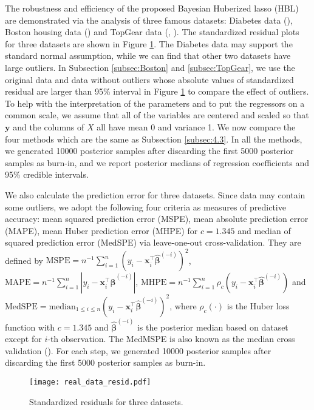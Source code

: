 \documentclass[11pt]{article}
\theoremstyle{plain}
\theoremstyle{definition}
\begin{document}
The robustness and efficiency of the proposed Bayesian Huberized lasso (HBL) are demonstrated via the analysis of three famous datasets: Diabetes data (\cite{EHJT04}), Boston housing data (\cite{HR78}) and TopGear data (\cite{ACG16}, \cite{A21}). The standardized residual plots for three datasets are shown in Figure \ref{fig:resid}. The Diabetes data may support the standard normal assumption, while we can find that other two datasets have large outliers. In Subsection \ref{subsec:Boston} and \ref{subsec:TopGear}, we use the original data and data without outliers whose absolute values of standardized residual are  larger than 95\% interval in Figure \ref{fig:resid} to compare the effect of outliers. To help with
the interpretation of the parameters and to put the regressors on a
common scale, we assume that all of the variables are centered and scaled so
that $\bm{y}$ and the columns of $X$ all have
mean 0 and variance 1. We now compare the four methods which are the same as Subsection \ref{subsec:4.3}. In all the methods, we generated 10000 posterior samples after discarding the first 5000 posterior samples as burn-in, and we report posterior medians of regression coefficients and 95\% credible intervals. 

We also calculate the prediction error for three datasets. Since data may contain some outliers, we adopt the following four criteria as measures of predictive accuracy: mean squared prediction error (MSPE), mean absolute prediction error (MAPE), mean Huber prediction error (MHPE) for $c=1.345$ and median of squared prediction error (MedSPE) via leave-one-out cross-validation. They are defined by $\mathrm{MSPE}=n^{-1} \sum_{i=1}^n (y_i - \bm{x}_i^{\top} \hat{\bm{\beta}}^{(-i)})^2$, $\mathrm{MAPE}=n^{-1}\sum_{i=1}^n |y_i - \bm{x}_i^{\top} \hat{\bm{\beta}}^{(-i)}|$, $\mathrm{MHPE}=n^{-1}\sum_{i=1}^n \rho_c (y_i - \bm{x}_i^{\top} \hat{\bm{\beta}}^{(-i)})$ and $\mathrm{MedSPE}=\mathrm{median}_{1\le i \le n} (y_i - \bm{x}_i^{\top} \hat{\bm{\beta}}^{(-i)})^2$, where $\rho_c(\cdot)$ is the Huber loss function with $c=1.345$ and $\hat{\bm{\beta}}^{(-i)}$ is the posterior median based on dataset except for $i$-th observation. The MedMSPE is also known as the median cross validation (\cite{ZY98}). For each step, we generated 10000 posterior samples after discarding the first 5000 posterior samples as burn-in.


\begin{figure}[htbp]
\centering
\texttt{[image: real\_data\_resid.pdf]}
\caption{Standardized residuals for three datasets.}
\label{fig:resid}
\end{figure}
\end{document}
